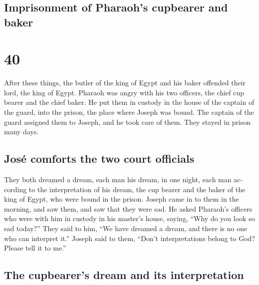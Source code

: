 \begin{paracol}{2}
\switchcolumn
\begin{otherlanguage}{english}

\hypertarget{imprisonment-of-pharaohs-cupbearer-and-baker}{%
\subsection{Imprisonment of Pharaoh's cupbearer and
baker}\label{imprisonment-of-pharaohs-cupbearer-and-baker}}

\hypertarget{section-79}{%
\section{40}\label{section-79}}

 After these things, the butler of the king of Egypt and
his baker offended their lord, the king of Egypt.  Pharaoh
was angry with his two officers, the chief cup bearer and the chief
baker.  He put them in custody in the house of the captain
of the guard, into the prison, the place where Joseph was bound.
 The captain of the guard assigned them to Joseph, and he
took care of them. They stayed in prison many days.

\hypertarget{josuxe9-comforts-the-two-court-officials}{%
\subsection{José comforts the two court
officials}\label{josuxe9-comforts-the-two-court-officials}}

 They both dreamed a dream, each man his dream, in one
night, each man according to the interpretation of his dream, the cup
bearer and the baker of the king of Egypt, who were bound in the prison.
 Joseph came in to them in the morning, and saw them, and
saw that they were sad.  He asked Pharaoh's officers who
were with him in custody in his master's house, saying, ``Why do you
look so sad today?''  They said to him, ``We have dreamed
a dream, and there is no one who can interpret it.'' Joseph said to
them, ``Don't interpretations belong to God? Please tell it to me.''

\hypertarget{the-cupbearers-dream-and-its-interpretation}{%
\subsection{The cupbearer's dream and its
interpretation}\label{the-cupbearers-dream-and-its-interpretation}}


\end{otherlanguage}
\end{paracol}

